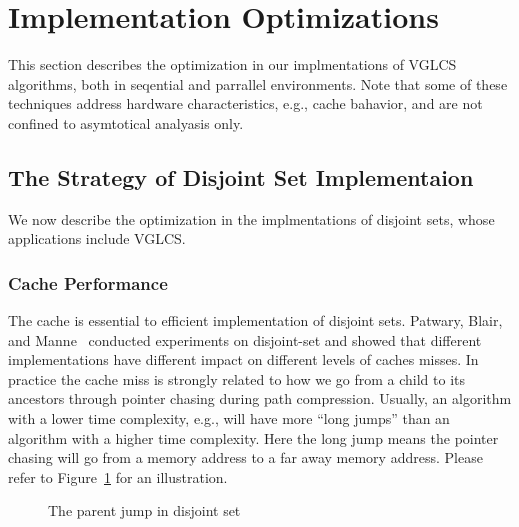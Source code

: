\section{Implementation Optimizations} \label{sec:Implementation}

This section describes the optimization in our implmentations of VGLCS
algorithms, both in seqential and parrallel environments.  Note that
some of these techniques address hardware characteristics, e.g., cache
bahavior, and are not confined to asymtotical analyasis only.

\subsection{The Strategy of Disjoint Set Implementaion}

We now describe the optimization in the implmentations of disjoint
sets, whose applications include VGLCS.


\subsubsection{Cache Performance}

The cache is essential to efficient implementation of disjoint sets.
Patwary, Blair, and Manne~\cite{Patwary2010ExperimentsOU} conducted
experiments on disjoint-set and showed that different implementations
have different impact on different levels of caches misses.  In
practice the cache miss is strongly related to how we go from a child
to its ancestors through pointer chasing during path compression.
Usually, an algorithm with a lower time complexity, e.g.,  will have more
``long jumps'' than an algorithm with a higher time complexity.  Here
the long jump means the pointer chasing will go from a memory address
to a far away memory address.  Please refer to
Figure~\ref{fig:long-short-jump-disjoint} for an illustration.

\begin{figure}[!thb]
  \centering {} 
  \caption{The parent jump in disjoint set}
  \label{fig:long-short-jump-disjoint}
\end{figure}

